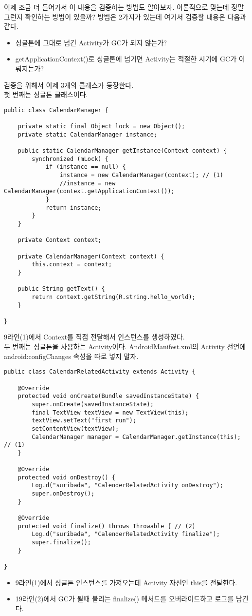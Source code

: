 
이제 조금 더 들어가서 이 내용을 검증하는 방법도 알아보자.
이론적으로 맞는데 정말 그런지 확인하는 방법이 있을까? 
방법은 2가지가 있는데 여기서 검증할 내용은 다음과 같다. 
\begin{itemize}
\item 싱글톤에 그대로 넘긴 Activity가 GC가 되지 않는가?
\item getApplicationContext()로 싱글톤에 넘기면 Activity는 적절한 시기에 GC가 이뤄지는가?
\end{itemize}

검증을 위해서 이제 3개의 클래스가 등장한다.\\ 

첫 번째는 싱글톤 클래스이다.
\begin{lstlisting}[frame=single]
public class CalendarManager {

	private static final Object lock = new Object();
	private static CalendarManager instance;
	
	public static CalendarManager getInstance(Context context) {
		synchronized (mLock) {
			if (instance == null) {
				instance = new CalendarManager(context); // (1)
				//instance = new CalendarManager(context.getApplicationContext());
			}
			return instance;
		}
	}
	
	private Context context;
	
	private CalendarManager(Context context) {
		this.context = context;
	}
	
	public String getText() {
		return context.getString(R.string.hello_world);
	}

}
\end{lstlisting}
9라인(1)에서 Context를 직접 전달해서 인스턴스를 생성하였다.\\

두 번째는 싱글톤을 사용하는 Activity이다. AndroidManifest.xml의 Activity 선언에 android:configChanges 속성을 따로 넣지 말자.
\begin{lstlisting}[frame=single]
public class CalendarRelatedActivity extends Activity {

	@Override
	protected void onCreate(Bundle savedInstanceState) {
		super.onCreate(savedInstanceState);
		final TextView textView = new TextView(this);
		textView.setText("first run");
		setContentView(textView);
		CalendarManager manager = CalendarManager.getInstance(this); // (1)
	}

	@Override
	protected void onDestroy() {
		Log.d("suribada", "CalenderRelatedActivity onDestroy");
		super.onDestroy();
	}
	
	@Override
	protected void finalize() throws Throwable { // (2)
		Log.d("suribada", "CalenderRelatedActivity finalize");
		super.finalize();
	}
	
}
\end{lstlisting}
\begin{itemize}
\item 9라인(1)에서 싱글톤 인스턴스를 가져오는데 Activity 자신인 this를 전달한다.
\item 19라인(2)에서 GC가 될때 불리는 finalize() 메서드를 오버라이드하고 로그를 남긴다.
\end{itemize}

